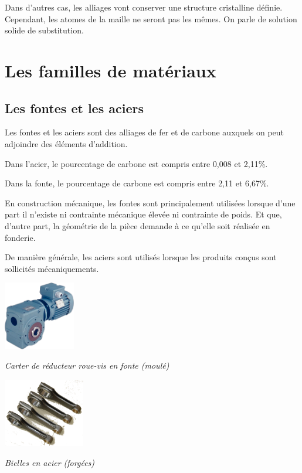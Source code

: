 \documentclass[11pt,oneside]{article}
\begin{document}
Dans d'autres cas, les alliages vont conserver une structure cristalline définie. Cependant, les atomes de la maille ne seront pas les mêmes. On parle de solution solide de substitution. 



\section{Les familles de matériaux}
\subsection{Les fontes et les aciers}
\begin{defi}

Les fontes et les aciers sont des alliages de fer et de carbone auxquels on peut adjoindre des éléments d'addition. 

Dans l'acier, le pourcentage de carbone est compris entre 0,008 et 2,11\%. 

Dans la fonte, le pourcentage de carbone est compris entre 2,11 et 6,67\%. 

\end{defi}


En construction mécanique, les fontes sont principalement utilisées lorsque d'une part il n'existe ni contrainte mécanique élevée ni contrainte de poids. Et que, d'autre part, la géométrie de la pièce demande à ce qu'elle soit réalisée en fonderie.

De manière générale, les aciers sont utilisés lorsque les produits conçus sont sollicités mécaniquements. 

\begin{minipage}[c]{.45\linewidth}
\begin{center}
\includegraphics[height=3cm]{png/carter}

\textit{Carter de réducteur roue-vis en fonte (moulé) \cite{carter}}
\end{center}
\end{minipage}\hfill
\begin{minipage}[c]{.45\linewidth}
\begin{center}
\includegraphics[height=3cm]{png/bielles}

\textit{Bielles en acier (forgées)}
\end{center}
\end{minipage}
\end{document}
